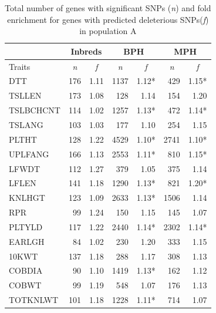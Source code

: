 \documentclass[12pt]{article}
\begin{document}
\begin{table}[!t]
  \begin{center}
    \caption[]{Total number of genes with significant SNPs (\emph{n}) and fold enrichment for genes with predicted deleterious SNPs(\emph{f}) in population A}
{\fontsize{10}{10}\sf
      \begin{tabular}{l|rr|rr|rr} 
\toprule
\multicolumn{1}{c}{}	&	\multicolumn{2}{c}{Inbreds}	&	\multicolumn{2}{c}{BPH}	&	\multicolumn{2}{c}{MPH}	\\	\hline 
Traits	& 	\multicolumn{1}{c}{\emph{n}} 	& 	\multicolumn{1}{c|}{\emph{f}}	& \multicolumn{1}{c}{\emph{n}} 	& 	\multicolumn{1}{c}{\emph{f}} 		& \multicolumn{1}{c}{\emph{n}} 	& 	\multicolumn{1}{c}{\emph{f}} 		\\	\hline \hline 
DTT	&	176	&	1.11	&	1137	&	1.12*	&	429	&	1.15*		\\
TSLLEN	&	173	&	1.08	&	128	&	1.14	&	154	&	1.20	\\
TSLBCHCNT	&	114	&	1.02	&	1257	&	1.13*	&	472	&	1.14*		\\
TSLANG	&	103	&	1.03	&	177	&	1.10	&	254	&	1.15	\\
PLTHT	&	128	&	1.22	&	4529	&	1.10*	&	2741	&	1.10*	\\
UPLFANG	&	166	&	1.13	&	2553	&	1.11*	&	810	&	1.15*	\\
LFWDT	&	112	&	1.27	&	379	&	1.05	&	375	&	1.14	\\
LFLEN	&	141	&	1.18	&	1290	&	1.13*	&	821	&	1.20*	\\
KNLHGT	&	123	&	1.09	&	2633	&	1.13*	&	1506	&	1.14	\\
RPR	&	99	&	1.24	&	150	&	1.15	&	145	&	1.07	\\
PLTYLD	&	117	&	1.22	&	2440	&	1.14*	&	2302	&	1.14*		\\
EARLGH	&	84	&	1.02	&	230	&	1.20	&	333	&	1.15	\\
10KWT	&	137	&	1.18	&	288	&	1.17	&	308	&	1.13	\\
COBDIA	&	90	&	1.10	&	1419	&	1.13*	&	162	&	1.12	\\
COBWT	&	99	&	1.19	&	548	&	1.07	&	176	&	1.13	\\
TOTKNLWT	&	101	&	1.18	&	1228	&	1.11*	&	714	&	1.07	\\
\bottomrule
      \end{tabular}
}
    \label{gene_enrichment_A}  
  \end{center}
\end{table}
\end{document}
